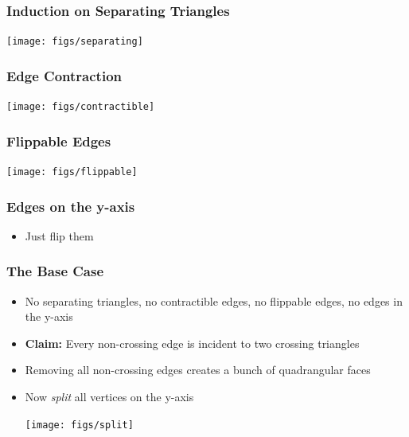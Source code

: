 \documentclass[xcolor=dvipsnames]{beamer}
\begin{document}
\begin{frame}
   \frametitle{Induction on Separating Triangles}
    \begin{center}
      \texttt{[image: figs/separating]}
    \end{center}
\end{frame}

\begin{frame}
   \frametitle{Edge Contraction}
    \begin{center}
      \texttt{[image: figs/contractible]}
    \end{center}
\end{frame}

\begin{frame}
   \frametitle{Flippable Edges}
    \begin{center}
      \texttt{[image: figs/flippable]}
    \end{center}
\end{frame}

\begin{frame}
   \frametitle{Edges on the y-axis}
    \begin{itemize}
       \item Just flip them
    \end{itemize}
\end{frame}


\begin{frame}
   \frametitle{The Base Case}
    \begin{itemize}[<+->]
       \item No separating triangles, no contractible edges, no flippable edges,
 no edges in the y-axis
       \item \textbf{Claim:} Every non-crossing edge is incident to two crossing triangles
       \item Removing all non-crossing edges creates a bunch of quadrangular faces 
       \item Now \emph{split} all vertices on the y-axis
       \centerline{\texttt{[image: figs/split]}} 
    \end{itemize}
\end{frame}
\end{document}
